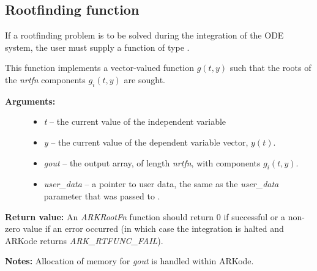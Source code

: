 \documentclass[letterpaper,10pt,english]{sphinxmanual}
\begin{document}
\subsection{Rootfinding function}
\label{c_interface/User_supplied:cinterface-rootfindingfn}\label{c_interface/User_supplied:rootfinding-function}
If a rootfinding problem is to be solved during the integration of the
ODE system, the user must supply a function of type {\hyperref[c_interface/User_supplied:ARKRootFn]{}}.

\begin{fulllineitems}
\label{c_interface/User_supplied:ARKRootFn}
This function implements a vector-valued function
$g(t,y)$ such that the roots of the \emph{nrtfn} components
$g_i(t,y)$ are sought.
\begin{description}
\item[{\textbf{Arguments:}}] \leavevmode\begin{itemize}
\item {} 
\emph{t} -- the current value of the independent variable

\item {} 
\emph{y} -- the current value of the dependent variable vector, $y(t)$.

\item {} 
\emph{gout} -- the output array, of length \emph{nrtfn}, with components $g_i(t,y)$.

\item {} 
\emph{user\_data} -- a pointer to user data, the same as the
\emph{user\_data} parameter that was passed to {\hyperref[c_interface/User_callable:ARKodeSetUserData]{}}.

\end{itemize}

\end{description}

\textbf{Return value:}
An \emph{ARKRootFn} function should return 0 if successful
or a non-zero value if an error occurred (in which case the
integration is halted and ARKode returns \emph{ARK\_RTFUNC\_FAIL}).

\textbf{Notes:} Allocation of memory for \emph{gout} is handled within ARKode.

\end{fulllineitems}
\end{document}

